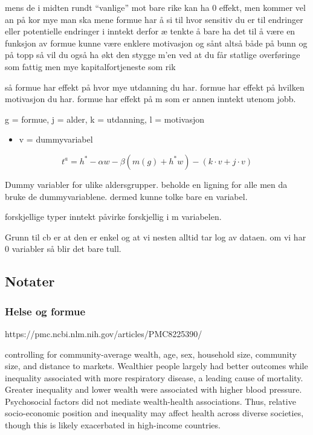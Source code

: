 \documentclass[
  12pt,
  a4paper,
  DIV=11,
  numbers=noendperiod]{scrartcl}
\providecommand{\tightlist}{%
  \setlength{\itemsep}{0pt}\setlength{\parskip}{0pt}}\usepackage{longtable,booktabs,array}
\begin{document}
mens de i midten rundt ``vanlige'' mot bare rike kan ha 0 effekt, men
kommer vel an på kor mye man ska mene formue har å si til hvor sensitiv
du er til endringer eller potentielle endringer i inntekt derfor æ
tenkte å bare ha det til å være en funksjon av formue kunne være enklere
motivasjon og sånt altså både på bunn og på topp så vil du også ha økt
den stygge m'en ved at du får statlige overføringe som fattig men mye
kapitalfortjeneste som rik

så formue har effekt på hvor mye utdanning du har. formue har effekt på
hvilken motivasjon du har. formue har effekt på m som er annen inntekt
utenom jobb.

g = formue, j = alder, k = utdanning, l = motivasjon

\begin{itemize}
\tightlist
\item
  v = dummyvariabel
\end{itemize}

\[
t^a = h^* - \alpha w - \beta(m(g) + h^*w) - (k\cdot v+j\cdot v)
\]

Dummy variabler for ulike aldersgrupper. beholde en ligning for alle men
da bruke de dummyvariablene. dermed kunne tolke bare en variabel.

forskjellige typer inntekt påvirke forskjellig i m variabelen.

Grunn til cb er at den er enkel og at vi nesten alltid tar log av
dataen. om vi har 0 variabler så blir det bare tull.

\subsection{Notater}\label{notater-1}

\subsubsection{Helse og formue}\label{helse-og-formue}

https://pmc.ncbi.nlm.nih.gov/articles/PMC8225390/

controlling for community-average wealth, age, sex, household size,
community size, and distance to markets. Wealthier people largely had
better outcomes while inequality associated with more respiratory
disease, a leading cause of mortality. Greater inequality and lower
wealth were associated with higher blood pressure. Psychosocial factors
did not mediate wealth-health associations. Thus, relative
socio-economic position and inequality may affect health across diverse
societies, though this is likely exacerbated in high-income countries.
\end{document}
